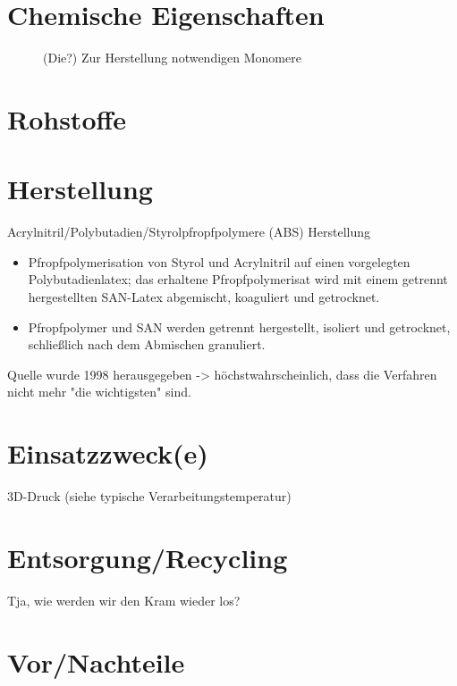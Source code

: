     \section*{Chemische Eigenschaften}
    \begin{figure}[H]
        \centering
        
        \caption[Die drei Monomere]{(Die?) Zur Herstellung notwendigen Monomere \cite{en.Wikipedia.2020.ABS}}
        \label{fig:Basic Monomere}
    \end{figure}

    \section*{Rohstoffe}

    \section*{Herstellung}
    Acrylnitril/Polybutadien/Styrolpfropfpolymere (ABS)
    Herstellung
    \begin{itemize}
        \item Pfropfpolymerisation von Styrol und Acrylnitril auf einen vorgelegten Polybutadienlatex; das erhaltene Pfropfpolymerisat
        wird mit einem getrennt hergestellten SAN-Latex abgemischt, koaguliert und getrocknet. \cite{Domininghaus.1998}
        \item Pfropfpolymer und SAN werden getrennt hergestellt, isoliert und getrocknet, schließlich nach dem Abmischen granuliert. \cite{Domininghaus.1998}
    \end{itemize}
    Quelle wurde 1998 herausgegeben -> höchstwahrscheinlich, dass die Verfahren nicht mehr "die wichtigsten" sind.

    \section*{Einsatzzweck(e)}
    3D-Druck (siehe typische Verarbeitungstemperatur)

    \section*{Entsorgung/Recycling}
    Tja, wie werden wir den Kram wieder los?

    \section*{Vor/Nachteile}